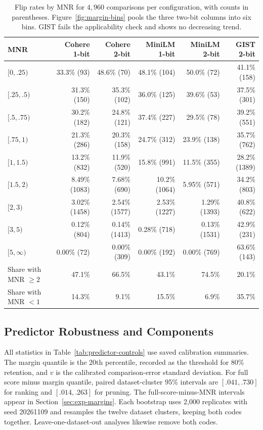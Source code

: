 \begin{table}[tbp]
\centering


\small
\setlength{\tabcolsep}{4pt}
\begin{tabular}{lrrrrr}
\toprule
MNR & Cohere 1-bit & Cohere 2-bit & MiniLM 1-bit & MiniLM 2-bit & GIST 2-bit \\
\midrule
$[0,.25)$    & 33.3\% (93)  & 48.6\% (70)   & 48.1\% (104) & 50.0\% (72)   & 41.1\% (158) \\
$[.25,.5)$   & 31.3\% (150) & 35.3\% (102)  & 36.0\% (125) & 39.6\% (53)   & 37.5\% (301) \\
$[.5,.75)$   & 30.2\% (182) & 24.8\% (121)  & 37.4\% (227) & 29.5\% (78)   & 39.2\% (551) \\
$[.75,1)$    & 21.3\% (286) & 20.3\% (158)  & 24.7\% (312) & 23.9\% (138)  & 35.7\% (762) \\
$[1,1.5)$    & 13.2\% (832) & 11.9\% (520)  & 15.8\% (991) & 11.5\% (355)  & 28.2\% (1389) \\
$[1.5,2)$    & 8.49\% (1083)& 7.68\% (690)  & 10.2\% (1064)& 5.95\% (571)  & 34.2\% (803) \\
$[2,3)$      & 3.02\% (1458)& 2.54\% (1577) & 2.53\% (1227)& 1.29\% (1393) & 40.8\% (622) \\
$[3,5)$      & 0.12\% (804) & 0.14\% (1413) & 0.28\% (718) & 0.13\% (1531) & 42.9\% (231) \\
$[5,\infty)$ & 0.00\% (72)  & 0.00\% (309)  & 0.00\% (192) & 0.00\% (769)  & 63.6\% (143) \\
\midrule
Share with MNR $\ge2$ & 47.1\% & 66.5\% & 43.1\% & 74.5\% & 20.1\% \\
Share with MNR $<1$   & 14.3\% & 9.1\% & 15.5\% & 6.9\% & 35.7\% \\
\bottomrule
\end{tabular}

\small
\caption{Flip rates by MNR for $4{,}960$ comparisons per configuration, with counts in parentheses. Figure~\ref{fig:margin-bins} pools the three two-bit columns into six bins. GIST fails the applicability check and shows no decreasing trend.}
\label{tab:app-margin-bins}
\end{table}

\subsection{Predictor Robustness and Components}
\label{app:predictor}

All statistics in Table~\ref{tab:predictor-controls} use saved calibration summaries. The margin quantile is the 20th percentile, recorded as the threshold for 80\% retention, and $v$ is the calibrated comparison-error standard deviation. For full score minus margin quantile, paired dataset-cluster 95\% intervals are $[.041,.730]$ for ranking and $[.014,.263]$ for pruning. The full-score-minus-MNR intervals appear in Section~\ref{sec:exp-margins}. Each bootstrap uses 2{,}000 replicates with seed 20261109 and resamples the twelve dataset clusters, keeping both codes together. Leave-one-dataset-out analyses likewise remove both codes.

